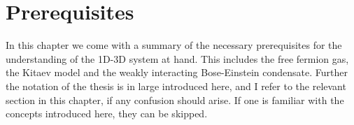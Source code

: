 
\chapter{Prerequisites} %

\label{Chapter2} %


In this chapter we come with a summary of the necessary prerequisites for the understanding of the 1D-3D system at hand. This includes the free fermion gas, the Kitaev model and the weakly interacting Bose-Einstein condensate. Further the notation of the thesis is in large introduced here, and I refer to the relevant section in this chapter, if any confusion should arise. If one is familiar with the concepts introduced here, they can be skipped. 

